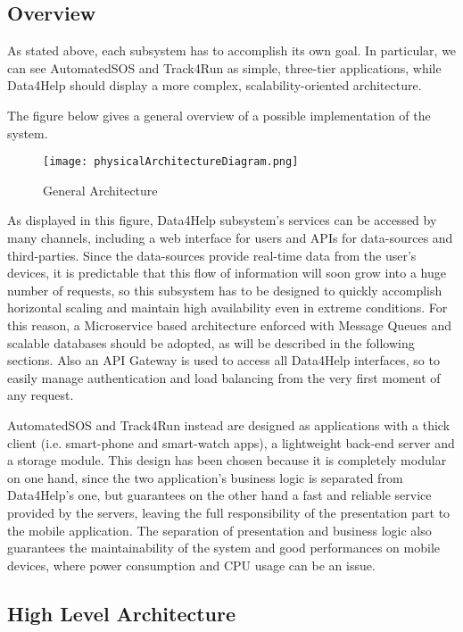 \subsection{Overview}
As stated above, each subsystem has to accomplish its own goal. In particular, we can see AutomatedSOS and Track4Run as simple, three-tier applications, while Data4Help should display a more complex, scalability-oriented architecture.

The figure below gives a general overview of a possible implementation of the system.

\FloatBarrier

\begin{figure}[!h]
	\centering
	\texttt{[image: physicalArchitectureDiagram.png]}
	\caption{General Architecture}
\end{figure}


\FloatBarrier

As displayed in this figure, Data4Help subsystem's services can be accessed by many channels, including a web interface for users and APIs for data-sources and third-parties.
Since the data-sources provide real-time data from the user's devices, it is predictable that this flow of information will soon grow into a huge number of requests, so this subsystem has to be designed to quickly accomplish horizontal scaling and maintain high availability even in extreme conditions.
For this reason, a Microservice based architecture enforced with Message Queues and scalable databases should be adopted, as will be described in the following sections. Also an API Gateway is used to access all Data4Help interfaces, so to easily manage authentication and load balancing from the very first moment of any request.

AutomatedSOS and Track4Run instead are designed as applications with a thick client (i.e. smart-phone and smart-watch apps), a lightweight back-end server and a storage module. This design has been chosen because it is completely modular on one hand, since the two application's business logic is separated from Data4Help's one, but guarantees on the other hand a fast and reliable service provided by the servers, leaving the full responsibility of the presentation part to the mobile application. The separation of presentation and business logic also guarantees the maintainability of the system and good performances on mobile devices, where power consumption and CPU usage can be an issue.

\subsection{High Level Architecture}

